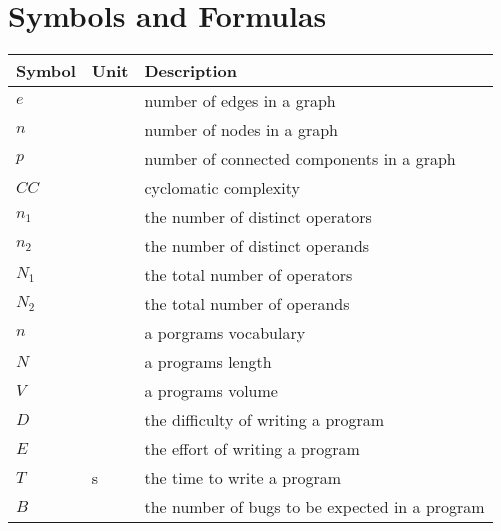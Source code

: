 \cleardoublepage
\section*{Symbols and Formulas}


\begin{table}[h!]
\begin{tabularx}{\linewidth}{p{2cm} p{1cm} X}
\textbf{Symbol} & \textbf{Unit} & \textbf{Description} \\
\hline\hline
$e$             &               & number of edges in a graph\\
$n$             &               & number of nodes in a graph\\
$p$             &               & number of connected components in a graph\\
$CC$            &               & cyclomatic complexity\\
$n_1$           &               & the number of distinct operators\\
$n_2$           &               & the number of distinct operands\\
$N_1$           &               & the total number of operators\\
$N_2$           &               & the total number of operands\\
$n$             &               & a porgrams vocabulary\\
$N$             &               & a programs length\\
$V$             &               & a programs volume\\
$D$             &               & the difficulty of writing a program\\
$E$             &               & the effort of writing a program\\
$T$             & \unit{s}      & the time to write a program\\
$B$             &               & the number of bugs to be expected in a program\\
\end{tabularx}
\end{table}
